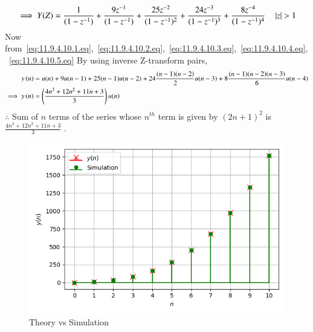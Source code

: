 \documentclass[journal,12pt,onecolumn]{IEEEtran}
\theoremstyle{remark}
\begin{document}
 \begin{equation}
\implies Y(Z)=\frac{1}{(1-z^{-1})} +\frac{9z^{-1}}{(1-z^{-1})} + \frac{25z^{-2}}{(1-z^{-1})^2} + \frac{24z^{-3}}{(1-z^{-1})^3} + \frac{8z^{-4}}{(1-z^{-1})^4} \quad \left\vert z\right\vert>1  \label{eq:11.9.4.10.5.eq}
 \end{equation}
Now from~\eqref{eq:11.9.4.10.1.eq},~\eqref{eq:11.9.4.10.2.eq},~\eqref{eq:11.9.4.10.3.eq},~\eqref{eq:11.9.4.10.4.eq},
 ~\eqref{eq:11.9.4.10.5.eq}
By using  inverse Z-transform pairs,
\begin{align}
  y\left(n\right)&= u(n) + 9u(n-1) + 25(n-1)u(n-2) + 24\frac{(n-1)(n-2)}{2}u(n-3) + 8\frac{(n-1)(n-2)(n-3)}{6}u(n-4) \\
\implies  y\left(n\right) &=\left(\frac{4n^{3}+12n^{2}+11n+3}{3}\right)u(n)
\end{align}
$\therefore$ Sum of $n$ terms of the series whose $n^{th}$ term is given by $(2n+1)^2$ is $\frac{4n^{3}+12n^{2}+11n+3}{3}$  .
\begin{figure}[h]
    \centering
     \includegraphics[width=\columnwidth]{./figs/fig2.png}
    \caption{Theory vs Simulation}    
    \label{}
\end{figure}
\end{document}
